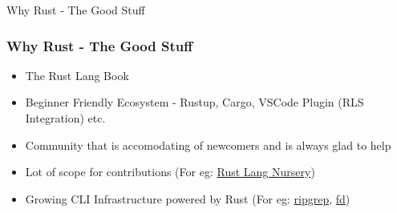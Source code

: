 \begin{section}{Why Rust - The Good Stuff}
  \begin{frame}
    \frametitle{Why Rust - The Good Stuff}
    \begin{itemize}
    \item The Rust Lang Book \cite{RustLangEd}
    \item Beginner Friendly Ecosystem - Rustup, Cargo, VSCode Plugin (RLS Integration) etc.
    \item Community that is accomodating of newcomers and is always glad to help
    \item Lot of scope for contributions (For eg: \href{https://github.com/rust-lang-nursery/}{Rust Lang Nursery})
    \item Growing CLI Infrastructure powered by Rust (For eg: \href{https://github.com/BurntSushi/riggrep/}{ripgrep}, \href{https://github.com/sharkdp/fd/}{fd})
    \end{itemize}
  \end{frame}
\end{section}
